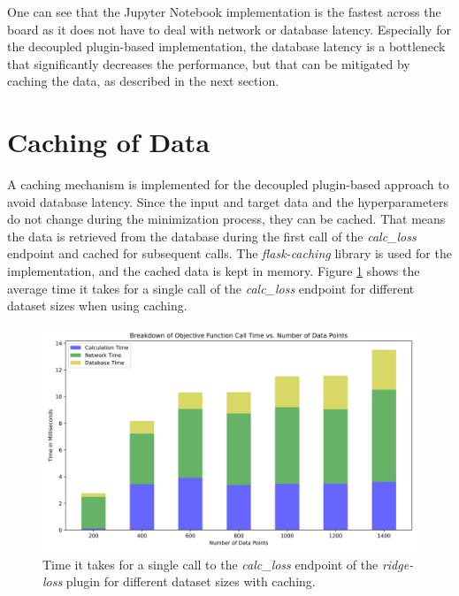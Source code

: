 \documentclass[
  a4paper,  %
  twoside,  %
  bibliography=totoc,
  headsepline,
  cleardoublepage=empty,
  parskip=half,
  draft=false
]{scrbook}
\begin{document}
One can see that the Jupyter Notebook implementation is the fastest across the board as it does not have to deal with network or database latency.
Especially for the decoupled plugin-based implementation, the database latency is a bottleneck that significantly decreases the performance, but that can be mitigated by caching the data, as described in the next section.

\section{Caching of Data}
\label{subsec:cachingOfData}

A caching mechanism is implemented for the decoupled plugin-based approach to avoid database latency.
Since the input and target data and the hyperparameters do not change during the minimization process, they can be cached.
That means the data is retrieved from the database during the first call of the \emph{calc\_loss} endpoint and cached for subsequent calls.
The \emph{flask-caching} library is used for the implementation, and the cached data is kept in memory.
Figure \ref{fig:of_call_time_version1_cached} shows the average time it takes for a single call of the \emph{calc\_loss} endpoint for different dataset sizes when using caching.

\begin{figure}
  \centering
  \includegraphics[width=\textwidth]{graphics/of_call_times_version1_cached.png}
  \caption[Call time for \emph{calc\_loss} endpoint decoupled approach with caching]{Time it takes for a single call to the \emph{calc\_loss} endpoint of the \emph{ridge-loss} plugin for different dataset sizes with caching.}
  \label{fig:of_call_time_version1_cached}
\end{figure}
\end{document}
